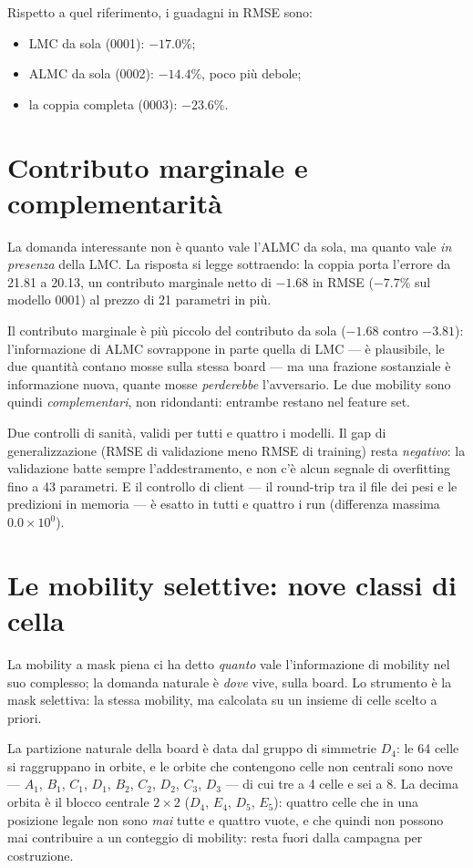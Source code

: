 Rispetto a quel riferimento, i guadagni in RMSE sono:

\begin{itemize}
  \item LMC da sola (0001): $-17.0\%$;
  \item ALMC da sola (0002): $-14.4\%$, poco più debole;
  \item la coppia completa (0003): $-23.6\%$.
\end{itemize}

\section{Contributo marginale e complementarità}

La domanda interessante non è quanto vale l'ALMC da sola, ma quanto
vale \emph{in presenza} della LMC. La risposta si legge sottraendo:
la coppia porta l'errore da 21.81 a 20.13, un contributo marginale
netto di $-1.68$ in RMSE ($-7.7\%$ sul modello 0001) al prezzo di 21
parametri in più.

Il contributo marginale è più piccolo del contributo da sola ($-1.68$
contro $-3.81$): l'informazione di ALMC sovrappone in parte quella di
LMC — è plausibile, le due quantità contano mosse sulla stessa board —
ma una frazione sostanziale è informazione nuova, quante mosse
\emph{perderebbe} l'avversario. Le due mobility sono
quindi \emph{complementari}, non ridondanti: entrambe restano nel
feature set.

Due controlli di sanità, validi per tutti e quattro i modelli. Il gap
di generalizzazione (RMSE di validazione meno RMSE di training) resta
\emph{negativo}: la validazione batte sempre l'addestramento, e non c'è
alcun segnale di overfitting fino a 43 parametri. E il controllo di
client — il round-trip tra il file dei pesi e le predizioni in
memoria — è esatto in tutti e quattro i run (differenza massima
$0.0\times10^{0}$).

\section{Le mobility selettive: nove classi di cella}

La mobility a mask piena ci ha detto \emph{quanto} vale
l'informazione di mobility nel suo complesso; la domanda naturale è
\emph{dove} vive, sulla board. Lo strumento è la mask selettiva: la
stessa mobility, ma calcolata su un insieme di celle scelto a priori.

La partizione naturale della board è data dal gruppo di simmetrie
$D_4$: le 64 celle si raggruppano in orbite, e le orbite che
contengono celle non centrali sono nove — $A_1$, $B_1$, $C_1$, $D_1$,
$B_2$, $C_2$, $D_2$, $C_3$, $D_3$ — di cui tre a 4 celle e sei a 8.
La decima orbita è il blocco centrale $2\times2$ ($D_4$, $E_4$,
$D_5$, $E_5$): quattro celle che in una posizione legale non sono
\emph{mai} tutte e quattro vuote, e che quindi non possono mai
contribuire a un conteggio di mobility: resta fuori dalla campagna per
costruzione.

